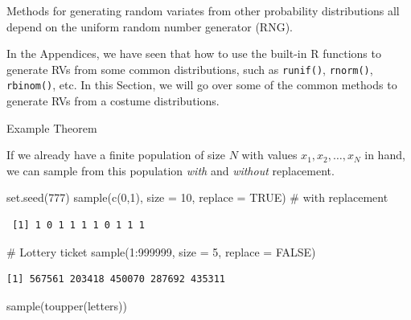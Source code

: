 \documentclass[
  letterpaper,
  DIV=11,
  numbers=noendperiod]{scrreprt}
\newenvironment{Shaded}{\begin{snugshade}}{\end{snugshade}}
\newcommand{\AttributeTok}[1]{\textcolor[rgb]{0.40,0.45,0.13}{#1}}
\newcommand{\CommentTok}[1]{\textcolor[rgb]{0.37,0.37,0.37}{#1}}
\newcommand{\ConstantTok}[1]{\textcolor[rgb]{0.56,0.35,0.01}{#1}}
\newcommand{\DecValTok}[1]{\textcolor[rgb]{0.68,0.00,0.00}{#1}}
\newcommand{\FunctionTok}[1]{\textcolor[rgb]{0.28,0.35,0.67}{#1}}
\newcommand{\NormalTok}[1]{\textcolor[rgb]{0.00,0.23,0.31}{#1}}
\newcommand{\SpecialCharTok}[1]{\textcolor[rgb]{0.37,0.37,0.37}{#1}}
\begin{document}
Methods for generating random variates from other probability
distributions all depend on the uniform random number generator (RNG).

In the Appendices, we have seen that how to use the built-in R functions
to generate RVs from some common distributions, such as
\texttt{runif()}, \texttt{rnorm()}, \texttt{rbinom()}, etc. In this
Section, we will go over some of the common methods to generate RVs from
a costume distributions.

Example Theorem

If we already have a finite population of size \(N\) with values
\(x_1, x_2, \ldots, x_N\) in hand, we can sample from this population
\emph{with} and \emph{without} replacement.

\begin{Shaded}
\begin{Highlighting}[]
\FunctionTok{set.seed}\NormalTok{(}\DecValTok{777}\NormalTok{)}
\FunctionTok{sample}\NormalTok{(}\FunctionTok{c}\NormalTok{(}\DecValTok{0}\NormalTok{,}\DecValTok{1}\NormalTok{), }\AttributeTok{size =} \DecValTok{10}\NormalTok{, }\AttributeTok{replace =} \ConstantTok{TRUE}\NormalTok{)  }\CommentTok{\# with replacement}
\end{Highlighting}
\end{Shaded}

\begin{verbatim}
 [1] 1 0 1 1 1 1 0 1 1 1
\end{verbatim}

\begin{Shaded}
\begin{Highlighting}[]
\CommentTok{\# Lottery ticket}
\FunctionTok{sample}\NormalTok{(}\DecValTok{1}\SpecialCharTok{:}\DecValTok{999999}\NormalTok{, }\AttributeTok{size =} \DecValTok{5}\NormalTok{, }\AttributeTok{replace =} \ConstantTok{FALSE}\NormalTok{)}
\end{Highlighting}
\end{Shaded}

\begin{verbatim}
[1] 567561 203418 450070 287692 435311
\end{verbatim}

\begin{Shaded}
\begin{Highlighting}[]
\FunctionTok{sample}\NormalTok{(}\FunctionTok{toupper}\NormalTok{(letters))}
\end{Highlighting}
\end{Shaded}
\end{document}
